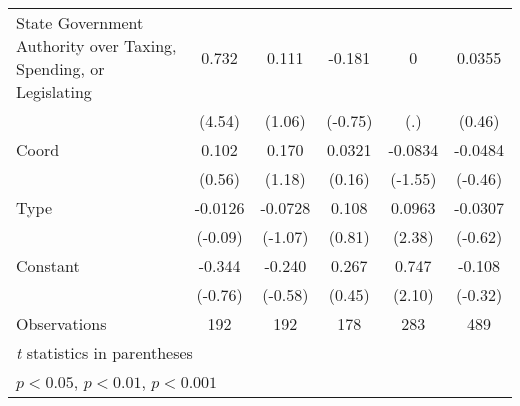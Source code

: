 {\begin{tabular*}{\linewidth}{@{\hskip\tabcolsep\extracolsep\fill}l*{5}{c}}
\addlinespace
State Government Authority over Taxing, Spending, or Legislating&    0.732\sym{***}&    0.111         &   -0.181         &        0         &   0.0355         \\
                &   (4.54)         &   (1.06)         &  (-0.75)         &      (.)         &   (0.46)         \\
\addlinespace
Coord           &    0.102         &    0.170         &   0.0321         &  -0.0834         &  -0.0484         \\
                &   (0.56)         &   (1.18)         &   (0.16)         &  (-1.55)         &  (-0.46)         \\
\addlinespace
Type            &  -0.0126         &  -0.0728         &    0.108         &   0.0963\sym{*}  &  -0.0307         \\
                &  (-0.09)         &  (-1.07)         &   (0.81)         &   (2.38)         &  (-0.62)         \\
\addlinespace
Constant        &   -0.344         &   -0.240         &    0.267         &    0.747\sym{*}  &   -0.108         \\
                &  (-0.76)         &  (-0.58)         &   (0.45)         &   (2.10)         &  (-0.32)         \\
\midrule
Observations    &      192         &      192         &      178         &      283         &      489         \\
\bottomrule
\multicolumn{6}{l}{\footnotesize \textit{t} statistics in parentheses}\\
\multicolumn{6}{l}{\footnotesize \sym{*} \(p<0.05\), \sym{**} \(p<0.01\), \sym{***} \(p<0.001\)}\\
\end{tabular*}
}

